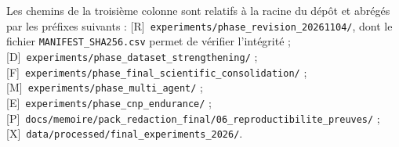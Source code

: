 
Les chemins de la troisième colonne sont relatifs à la racine du dépôt et
abrégés par les préfixes suivants : [R]~\texttt{experiments/phase\_revision\_20261104/},
dont le fichier \texttt{MANIFEST\_SHA256.csv} permet de vérifier l'intégrité ;
[D]~\texttt{experiments/phase\_dataset\_strengthening/} ;
[F]~\texttt{experiments/phase\_final\_scientific\_consolidation/} ;
[M]~\texttt{experiments/phase\_multi\_agent/} ;
[E]~\texttt{experiments/phase\_cnp\_endurance/} ;
[P]~\texttt{docs/memoire/pack\_redaction\_final/06\_reproductibilite\_preuves/} ;
[X]~\texttt{data/processed/final\_experiments\_2026/}.

